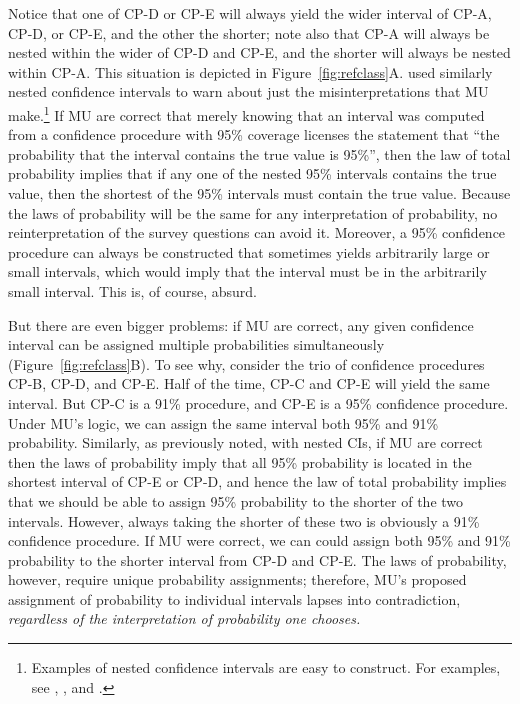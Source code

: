 \documentclass[jou,a4paper,floatsintext,draftfirst]{apa6}\usepackage[]{graphicx}\usepackage[]{color}
\begin{document}
Notice that one of CP-D or CP-E will always yield the wider interval of CP-A, CP-D, or CP-E, and the other the shorter; note also that CP-A will always be nested within the wider of CP-D and CP-E, and the shorter will always be nested within CP-A. This situation is depicted in Figure~\ref{fig:refclass}A. \citet{Neyman:1952} used similarly nested confidence intervals to warn about just the misinterpretations that MU make.\footnote{Examples of nested confidence intervals are easy to construct. For examples, see \citet{Neyman:1952}, \citet{Welch:1939}, and \citet{Morey:etal:unpublished}.}  If MU are correct that merely knowing that an interval was computed from a confidence procedure with 95\% coverage licenses the statement that ``the probability that the interval contains the true value is 95\%'', then the law of total probability implies that if any one of the nested 95\% intervals contains the true value, then the shortest of the 95\% intervals must contain the true value. Because the laws of probability will be the same for any interpretation of probability, no reinterpretation of the survey questions can avoid it. Moreover, a 95\% confidence procedure can always be constructed that sometimes yields arbitrarily large or small intervals, which would imply that the interval must be in the arbitrarily small interval. This is, of course, absurd.

But there are even bigger problems: if MU are correct, any given confidence interval can be assigned multiple probabilities simultaneously (Figure~\ref{fig:refclass}B). To see why, consider the trio of confidence procedures CP-B, CP-D, and CP-E. Half of the time, CP-C and CP-E will yield the same interval. But CP-C is a 91\% procedure, and CP-E is a 95\% confidence procedure. Under MU's logic, we can assign the same interval both 95\% and 91\% probability. Similarly, as previously noted, with nested CIs, if MU are correct then the laws of probability imply that all 95\% probability is located in the shortest interval of CP-E or CP-D, and hence the law of total probability implies that we should be able to assign 95\% probability to the shorter of the two intervals. However, always taking the shorter of these two is obviously a 91\% confidence procedure. If MU were correct, we can could assign both 95\% and 91\% probability to the shorter interval from CP-D and CP-E. The laws of probability, however, require unique probability assignments; therefore, MU's proposed assignment of probability to individual intervals lapses into contradiction, {\em regardless of the interpretation of probability one chooses.} 
\end{document}
